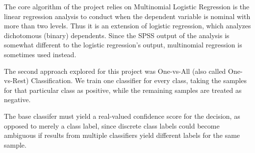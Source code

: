 \documentclass[journal]{IEEEtran}
\begin{document}
The core algorithm of the project relies on Multinomial Logistic Regression is the linear regression analysis to conduct when the dependent variable is nominal with more than two levels.  Thus it is an extension of logistic regression, which analyzes dichotomous (binary) dependents.  Since the SPSS output of the analysis is somewhat different to the logistic regression’s output, multinomial regression is sometimes used instead. \par

The second approach explored for this project was One-vs-All (also called One-vs-Rest) Classification. We train one classifier for every class, taking the samples for that particular class as positive, while the remaining samples are treated as negative. \par
The base classifer must yield a real-valued confidence score for the decision, as opposed to merely a class label, since discrete class labels could become ambiguous if results from multiple classifiers yield different labels for the same sample. \par
\end{document}
